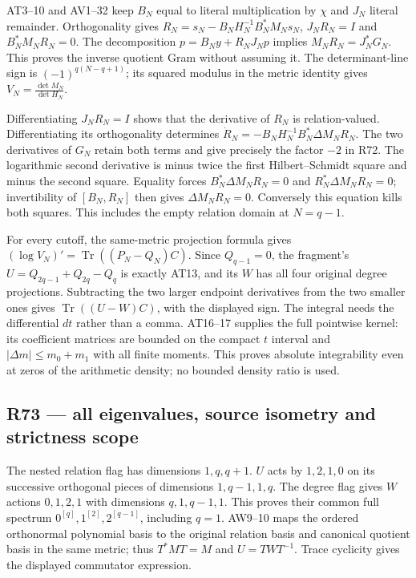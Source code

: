 AT3--10 and AV1--32 keep \(B_N\) equal to literal multiplication by
\(\chi\) and \(J_N\) literal remainder. Orthogonality gives
\(R_N=s_N-B_NH_N^{-1}B_N^*M_Ns_N\), \(J_NR_N=I\) and \(B_N^*M_NR_N=0\).
The decomposition \(p=B_Ny+R_NJ_Np\) implies \(M_NR_N=J_N^*G_N\). This
proves the inverse quotient Gram without assuming it. The
determinant-line sign is \((-1)^{q(N-q+1)}\); its squared modulus in the
metric identity gives \(V_N=\frac{\det M_N}{\det H_N}\).

Differentiating \(J_NR_N=I\) shows that the derivative of \(R_N\) is
relation-valued. Differentiating its orthogonality determines
\(\dot R_N=-B_NH_N^{-1}B_N^*\Delta M_NR_N\). The two derivatives of
\(G_N\) retain both terms and give precisely the factor \(-2\) in R72.
The logarithmic second derivative is minus twice the first
Hilbert--Schmidt square and minus the second square. Equality forces
\(B_N^*\Delta M_NR_N=0\) and \(R_N^*\Delta M_NR_N=0\); invertibility of
\([B_N,R_N]\) then gives \(\Delta M_NR_N=0\). Conversely this equation
kills both squares. This includes the empty relation domain at
\(N=q-1\).

For every cutoff, the same-metric projection formula gives
\((\log V_N)'=\operatorname{Tr}((P_N-Q_N)C)\). Since \(Q_{q-1}=0\), the
fragment's \(U=Q_{2q-1}+Q_{2q}-Q_q\) is exactly AT13, and its \(W\) has
all four original degree projections. Subtracting the two larger
endpoint derivatives from the two smaller ones gives
\(\operatorname{Tr}((U-W)C)\), with the displayed sign. The integral
needs the differential \(dt\) rather than a comma. AT16--17 supplies the
full pointwise kernel: its coefficient matrices are bounded on the
compact \(t\) interval and \(|\Delta m|\leq m_0+m_1\) with all finite
moments. This proves absolute integrability even at zeros of the
arithmetic density; no bounded density ratio is used.

\subsection{R73 --- all eigenvalues, source isometry and strictness
scope}\label{r73-all-eigenvalues-source-isometry-and-strictness-scope}

The nested relation flag has dimensions \(1,q,q+1\). \(U\) acts by
\(1,2,1,0\) on its successive orthogonal pieces of dimensions
\(1,q-1,1,q\). The degree flag gives \(W\) actions \(0,1,2,1\) with
dimensions \(q,1,q-1,1\). This proves their common full spectrum
\(0^{[q]},1^{[2]},2^{[q-1]}\), including \(q=1\). AW9--10 maps the
ordered orthonormal polynomial basis to the original relation basis and
canonical quotient basis in the same metric; thus \(T^*MT=M\) and
\(U=TWT^{-1}\). Trace cyclicity gives the displayed commutator
expression.

